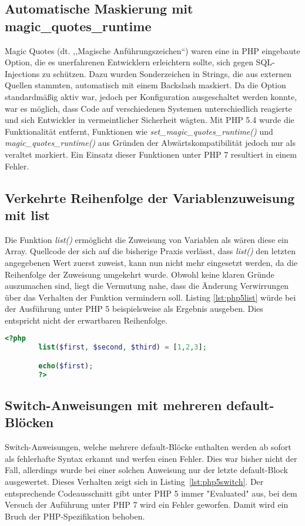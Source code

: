     \subsection{Automatische Maskierung mit magic\_quotes\_runtime}
    Magic Quotes (dt. ,,Magische Anführungszeichen``) waren eine in \ac{PHP} eingebaute Option, die es unerfahrenen Entwicklern 
    erleichtern sollte, sich gegen SQL-Injections zu schützen. Dazu wurden Sonderzeichen in Strings, die aus externen Quellen 
    stammten, automatisch mit einem Backslash maskiert. Da die Option standardmäßig aktiv war, jedoch per Konfiguration 
    ausgeschaltet werden konnte, war es möglich, dass Code auf verschiedenen Systemen unterschiedlich reagierte und sich 
    Entwickler in vermeintlicher Sicherheit wägten.\cite{php_group_php:_nodate-4} Mit \ac{PHP} 5.4 wurde die Funktionalität entfernt, Funktionen wie 
    \textit{set\_magic\_quotes\_runtime()} und \textit{magic\_quotes\_runtime()} aus Gründen der Abwärtskompatibilität jedoch 
    nur als veraltet markiert. Ein Einsatz dieser Funktionen unter \ac{PHP} 7 resultiert in einem Fehler. 
    
    \subsection{Verkehrte Reihenfolge der Variablenzuweisung mit list}
    Die Funktion \textit{list()} ermöglicht die Zuweisung von Variablen als wären diese ein Array. Quellcode der sich auf die bisherige Praxis verlässt, dass \textit{list()}
    den letzten angegebenen Wert zuerst zuweist, kann nun nicht mehr eingesetzt werden, da die Reihenfolge der Zuweisung umgekehrt wurde. 
    Obwohl keine klaren Gründe auszumachen sind, liegt die Vermutung nahe, dass die Änderung Verwirrungen über das Verhalten der Funktion vermindern soll. Listing
    \ref{lst:php5list} würde bei der Ausführung unter \acs{PHP} 5 beispielsweise \grqq{} als Ergebnis ausgeben. Dies entspricht nicht der erwartbaren Reihenfolge.

    \begin{lstlisting}[language=php, caption={Beispiel der Verwendung von list()}, label={lst:php5list}]
        <?php
        list($first, $second, $third) = [1,2,3];

        echo($first);
        ?>
    \end{lstlisting}

    \subsection{Switch-Anweisungen mit mehreren default-Blöcken}\label{switch}
    Switch-Anweisungen, welche mehrere default-Blöcke enthalten werden ab sofort als fehlerhafte Syntax erkannt und werfen einen Fehler. Dies war bisher nicht der Fall,
    allerdings wurde bei einer solchen Anweisung nur der letzte default-Block ausgewertet. Dieses Verhalten zeigt sich in Listing~\ref{lst:php5switch}. Der entsprechende
    Codeausschnitt gibt unter \acs{PHP} 5 immer "Evaluated" aus, bei dem Versuch der Auführung unter \acs{PHP} 7 wird ein Fehler geworfen. Damit wird ein Bruch der
    \acs{PHP}-Spezifikation \cite{php_group_php_nodate} behoben.


